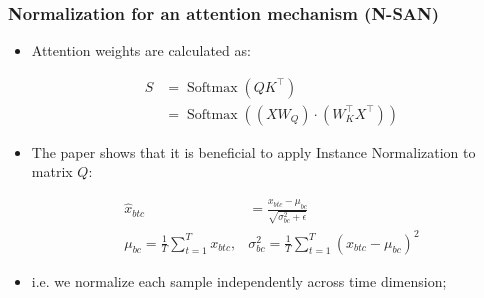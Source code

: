 \documentclass[10pt]{beamer}
\begin{document}
\begin{frame}
    \frametitle{Normalization for an attention mechanism (N-SAN)}
    \begin{itemize}
        \item Attention weights are calculated as:
        
\begin{equation}
\begin{aligned}
S &=\operatorname{Softmax}\left(Q K^{\top}\right) \\
&=\operatorname{Softmax}\left(\left(X W_{Q}\right) \cdot\left(W_{K}^{\top} X^{\top}\right)\right)
\end{aligned}
\end{equation}
        
        \item The paper shows that it is beneficial to apply Instance Normalization to matrix $Q$:

\begin{equation}
\begin{aligned}
\hat{x}_{b t c} &=\frac{x_{b t c}-\mu_{b c}}{\sqrt{\sigma_{b c}^{2}+\epsilon}} \\
\mu_{b c}=\frac{1}{T} \sum_{t=1}^{T} x_{b t c}, & \sigma_{b c}^{2}=\frac{1}{T} \sum_{t=1}^{T}\left(x_{b t c}-\mu_{b c}\right)^{2}
\end{aligned}
\end{equation}

    \item i.e. we normalize each sample independently across time dimension;
    \end{itemize}
\end{frame}
\end{document}
